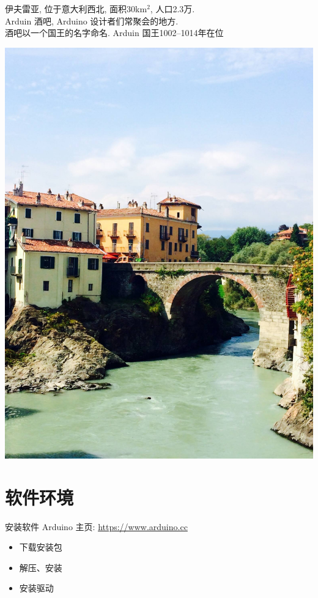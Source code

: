 \documentclass[a4paper,11pt]{seminar}
\begin{document}
\begin{minipage}[b]{.46\textwidth}
伊夫雷亚, 位于意大利西北, 面积30km$^2$, 人口2.3万.
\ \\
Arduin 酒吧, Arduino 设计者们常聚会的地方.
\ \\
酒吧以一个国王的名字命名. Arduin 国王1002--1014年在位
\ \vskip 3.6cm ~\
\end{minipage}
\begin{minipage}[t]{.52\textwidth}
\centering\includegraphics[width=.9\textwidth]{Ivrea}
\end{minipage}
\endslide
\chapter{软件环境}{安装软件}
Arduino 主页:  \url{https://www.arduino.cc}

\begin{itemize}
    \item 下载安装包
    \item 解压、安装
    \item 安装驱动
\end{itemize}
\endslide
\end{document}
